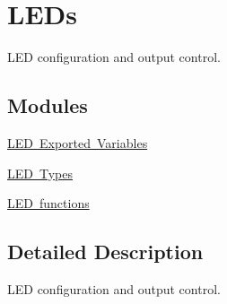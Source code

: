\hypertarget{group___s_d___l_e_d}{}\section{L\+E\+Ds}
\label{group___s_d___l_e_d}


L\+ED configuration and output control.  


\subsection*{Modules}
\begin{DoxyCompactItemize}
\item 
\mbox{\hyperlink{group___s_d___l_e_d___exported___variables}{L\+E\+D Exported Variables}}
\item 
\mbox{\hyperlink{group___s_d___l_e_d___types}{L\+E\+D Types}}
\item 
\mbox{\hyperlink{group___s_d___l_e_d___functions}{L\+E\+D functions}}
\end{DoxyCompactItemize}


\subsection{Detailed Description}
L\+ED configuration and output control. 

